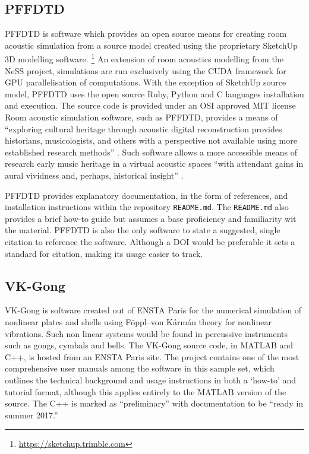 \cite{bilbao_physical_2019}

\subsection{PFFDTD}

PFFDTD \cite{hamilton_pffdtd_2021} is software which provides an open source means for creating room acoustic simulation from a source model created using the proprietary SketchUp 3D modelling software.
\footnote{\url{https://sketchup.trimble.com}}
An extension of room acoustics modelling from the NeSS project, simulations are run exclusively using the CUDA framework for GPU parallelisation of computations. With the exception of SketchUp source model, PFFDTD uses the open source Ruby, Python and C languages installation and execution. 
The source code is provided under an OSI approved MIT license
Room acoustic simulation software, such as PFFDTD, provides a means of ``exploring cultural heritage through acoustic digital reconstruction provides historians, musicologists, and others with a perspective not available using more established research methods'' \cite{katz_exploring_2020}. Such software allows  a more accessible means of research early music heritage in a virtual acoustic spaces \cite{tronchin_acoustics_1997} ``with attendant gains in
aural vividness and, perhaps, historical insight'' \cite{cook_hearing_2023}.

PFFDTD provides explanatory documentation, in the form of references, and installation instructions within the repository \texttt{README.md}. The \texttt{README.md} also provides a brief how-to guide but assumes a base proficiency and familiarity wit the material. PFFDTD is also the only software to state a suggested, single citation to reference the software. Although a DOI would be preferable it sets a standard for citation, making its usage easier to track.

\subsection{VK-Gong}

VK-Gong is software created out of ENSTA Paris for the numerical simulation of nonlinear plates and shells using Föppl–von Kármán theory for nonlinear vibrations. Such non linear systems would be found in percussive instruments such as gongs, cymbals and bells.  The VK-Gong source code, in MATLAB and C\textsc{++}, is hosted from an ENSTA Paris site. The project contains one of the most comprehensive user manuals \cite{vkgong_manual_2017} among the  software in this sample set, which outlines the technical background and usage instructions in both a `how-to' and tutorial format, although this applies entirely to the MATLAB version of the source. The C\textsc{++} is marked as ``preliminary'' with documentation to be ``ready in summer 2017.''

